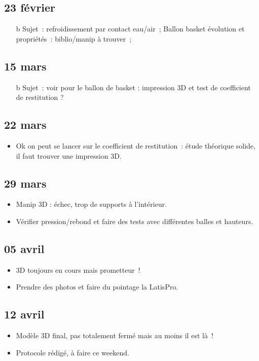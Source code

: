 \documentclass[a4paper, 11pt, final, garamond]{book}
\begin{document}
\subsection{23 février}
\begin{itemize}
	\item[b]{Sujet}~: refroidissement par contact eau/air~; Ballon basket évolution
	et propriétés~: biblio/manip à trouver~;
\end{itemize}

\subsection{15 mars}
\begin{itemize}
	\item[b]{Sujet}~: voir pour le ballon de basket : impression 3D et test de
	coefficient de restitution ?
\end{itemize}

\subsection{22 mars}
\begin{itemize}
	\item Ok on peut se lancer sur le coefficient de restitution~: étude théorique
	      solide, il faut trouver une impression 3D.
\end{itemize}

\subsection{29 mars}
\begin{itemize}
	\item Manip 3D : échec, trop de supports à l'intérieur.
	\item Vérifier pression/rebond et faire des tests avec différentes balles et
	      hauteurs.
\end{itemize}

\subsection{05 avril}
\begin{itemize}
	\item 3D toujours en cours mais prometteur~!
	\item Prendre des photos et faire du pointage la LatisPro.
\end{itemize}

\subsection{12 avril}
\begin{itemize}
	\item Modèle 3D final, pas totalement fermé mais au moins il est là~!
	\item Protocole rédigé, à faire ce weekend.
\end{itemize}
\end{document}
